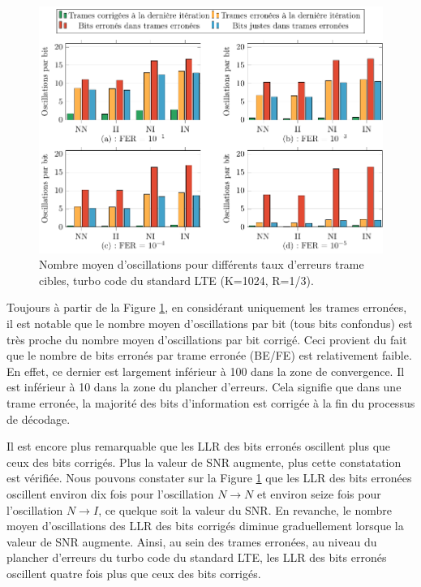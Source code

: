 \begin{figure}[tb]
	\begin{center}
	\includegraphics[width=.9\textwidth]{main/ch2_fig/tikz/m_lte.pdf}
	\caption{Nombre moyen d'oscillations pour différents taux d'erreurs trame cibles, turbo code du standard LTE (K=1024, R=1/3). \label{ch2:fig:meanlte}}
	\end{center}
\end{figure}

Toujours à partir de la Figure \ref{ch2:fig:meanlte}, en considérant uniquement les trames erronées, il est notable que le nombre moyen 
d’oscillations par bit (tous bits confondus) est très proche du nombre moyen d’oscillations par bit corrigé. Ceci 
provient du fait que le nombre de bits erronés par trame erronée (BE/FE) est relativement faible. En effet, ce dernier 
est largement inférieur à 100 dans la zone de convergence. Il est inférieur à 10 dans la zone du plancher d'erreurs. Cela
signifie que dans une trame erronée, la majorité des bits d'information est corrigée à la fin du processus de décodage. 

Il est encore plus remarquable que les LLR des bits erronés oscillent plus que ceux des bits corrigés. Plus la valeur de SNR augmente, 
plus cette constatation est vérifiée. Nous pouvons constater sur la Figure \ref{ch2:fig:meanlte} que les LLR des bits erronées 
oscillent environ dix fois pour l'oscillation $N\rightarrow N$ et environ seize fois pour 
l'oscillation $N\rightarrow I$, ce quelque soit la valeur du SNR. En revanche, le nombre moyen d'oscillations des LLR des bits corrigés 
diminue graduellement lorsque la valeur de SNR augmente. Ainsi, au sein des trames erronées, au niveau du plancher d'erreurs 
du turbo code du standard LTE, les LLR des bits erronés oscillent quatre fois plus que ceux des bits corrigés.

